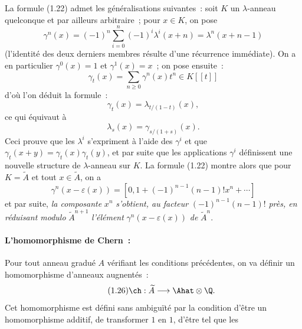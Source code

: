 La
formule (1.22) admet les généralisations suivantes~: soit $K$ un $\lambda$-anneau quelconque et par ailleurs arbitraire~; pour $x\in K$, on pose
\begin{equation}\tag{1.23}
\gamma^n(x)=(-1)^n\sum_{i=0}^n(-1)^i\lambda^i(x+n)=\lambda^n(x+n-1)
\end{equation}
(l'identité des deux derniers membres résulte d'une récurrence immédiate). On a en particulier $\gamma^0(x)=1$ et $\gamma^1(x)=x$~; on pose ensuite~:
\begin{equation}\tag{1.24}
\gamma_t(x)=\sum_{n\geq0}\gamma^n(x)t^n\in K[[t]]
\end{equation}
d'où l'on déduit la formule~:
\begin{equation}\tag{1.25}
\gamma_t(x)=\lambda_{t/(1-t)}(x),
\end{equation}
ce qui équivaut à
\begin{equation}\tag{1.25 bis}
\lambda_s(x)=\gamma_{s/(1+s)}(x).
\end{equation}
Ceci prouve que les $\lambda^i$ s'expriment à l'aide des $\gamma^i$ et que $\gamma_t(x+y)=\gamma_t(x)\gamma_t(y)$, et par suite que les applications $\gamma^i$ définissent une nouvelle structure de $\lambda$-anneau sur $K$. La formule (1.22) montre alors que pour $K=\widetilde A$ et tout $x\in\widetilde A$, on a
\begin{equation}\tag{1.22 bis}
\gamma^n(x-\varepsilon(x))=[0,1+(-1)^{n-1}(n-1)!x^n+\cdots]
\end{equation}
et par suite, \emph{la composante} $x^n$ \emph{s'obtient, au facteur} $(-1)^{n-1}(n-1)!$ \emph{près, en réduisant modulo} $\widetilde A^{n+1}$ \emph{l'élément} $\gamma^n(x-\varepsilon(x))$ \emph{de} $\widetilde A^n$.

\paragraph{L'homomorphisme de Chern~:}
Pour tout anneau gradué $A$ vérifiant les conditions précédentes, on va définir un homomorphisme d'anneaux augnentés~:
\begin{equation}\tag{1.26}
\ch:\widetilde A\longrightarrow \Ahat\otimes\Q.
\end{equation}
Cet homomorphisme est défini sans ambiguïté par la condition d'être un homomorphisme additif, de transformer $1$ en $1$, d'être tel que les
